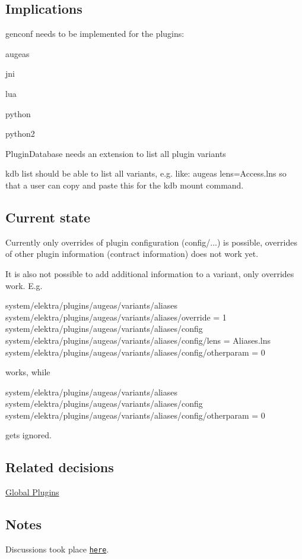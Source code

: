 \subsection*{Implications}


\begin{DoxyItemize}
\item {\ttfamily genconf} needs to be implemented for the plugins\+:
\begin{DoxyItemize}
\item augeas
\item jni
\item lua
\item python
\item python2
\end{DoxyItemize}
\item {\ttfamily Plugin\+Database} needs an extension to list all plugin variants
\item {\ttfamily kdb list} should be able to list all variants, e.\+g. like\+: {\ttfamily augeas lens=Access.\+lns} so that a user can copy and paste this for the {\ttfamily kdb mount} command.
\end{DoxyItemize}

\subsection*{Current state}

Currently only overrides of plugin configuration ({\ttfamily config/...}) is possible, overrides of other plugin information (contract information) does not work yet.

It is also not possible to add additional information to a variant, only overrides work. E.\+g. 
\begin{DoxyCode}
system/elektra/plugins/augeas/variants/aliases
system/elektra/plugins/augeas/variants/aliases/override = 1
system/elektra/plugins/augeas/variants/aliases/config
system/elektra/plugins/augeas/variants/aliases/config/lens = Aliases.lns
system/elektra/plugins/augeas/variants/aliases/config/otherparam = 0
\end{DoxyCode}
 works, while 
\begin{DoxyCode}
system/elektra/plugins/augeas/variants/aliases
system/elektra/plugins/augeas/variants/aliases/config
system/elektra/plugins/augeas/variants/aliases/config/otherparam = 0
\end{DoxyCode}
 gets ignored.

\subsection*{Related decisions}


\begin{DoxyItemize}
\item \hyperlink{doc_decisions_global_plugins_md}{Global Plugins}
\end{DoxyItemize}

\subsection*{Notes}

Discussions took place \href{https://git.libelektra.org/issues/1006}{\tt here}. 